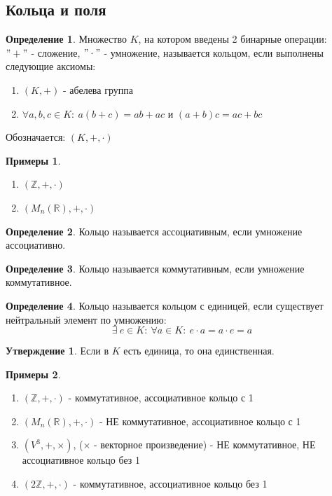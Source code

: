 \documentclass[a4paper, 12pt]{article}
\newcommand{\R}{\mathbb R}
\newcommand{\Z}{\mathbb Z}
\newcommand\tab[1][.5cm]{\hspace*{#1}}
\theoremstyle{definition}
\newtheorem*{definition}{Определение}
\newtheorem*{subtheorem}{Утверждение}
\newtheorem*{example}{Примеры}
\begin{document}
  \subsection{Кольца и поля}
  \begin{definition}
    Множество $K$, на котором введены 2 бинарные операции:\\ $"+"$ - сложение, $"\cdot"$ - умножение, называется кольцом, если выполнены следующие аксиомы:
    \begin{enumerate}
      \item $(K, +)$ - абелева группа
      \item $\forall a,b,c \in K: \ a(b+c) = ab+ac$ и $(a+b)c = ac+bc$
    \end{enumerate}
    Обозначается: $(K, +, \cdot)$
  \end{definition} 
  \begin{example}\tab
    \begin{enumerate}
      \item $(\Z, +, \cdot)$
      \item $(M_n(\R), +, \cdot)$
    \end{enumerate}
  \end{example}
  \begin{definition}
    Кольцо называется ассоциативным, если умножение ассоциативно.
  \end{definition}
  \begin{definition}
    Кольцо называется коммутативным, если умножение коммутативное.
  \end{definition}
  \begin{definition}
    Кольцо называется кольцом с единицей, если существует нейтральный элемент по умножению:
    $$\exists \ e \in K: \ \forall a\in K: \ e \cdot a = a \cdot e = a$$ 
  \end{definition}
  \begin{subtheorem}
    Если в $K$ есть единица, то она единственная. 
  \end{subtheorem} 
  \begin{example} \tab
    \begin{enumerate}
      \item $(\Z, +, \cdot)$ - коммутативное, ассоциативное кольцо с 1
      \item $(M_n(\R), +, \cdot)$ - НЕ коммутативное, ассоциативное кольцо с 1
      \item $(V^3,+, \times)$, ($\times$ - векторное произведение) - НЕ коммутативное, НЕ ассоциативное кольцо без 1
      \item $(2\Z, +, \cdot)$ -  коммутативное, ассоциативное кольцо без 1
    \end{enumerate}
  \end{example}
\end{document}
